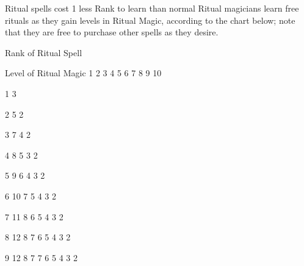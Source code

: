 \documentclass[twoside]{book}
\begin{document}
                  Ritual spells cost 1 less Rank to learn than
                 normal 
                  Ritual magicians learn free rituals as they gain
                 levels in Ritual Magic, according to the chart below;
                 note that they are free to purchase other spells as they
                 desire. 
              
              Rank of Ritual Spell  
                
                  
                   Level of Ritual Magic   
                   1 
                   2   
                   3 
                   4   
                   5 
                   6   
                   7 
                   8   
                   9 
                   10   
                  
                  
                   1 
                   3   
                  
                  
                   2 
                   5 
                   2   
                  
                  
                   3 
                   7 
                   4 
                   2   
                  
                  
                   4 
                   8 
                   5 
                   3 
                   2   
                  
                  
                   5 
                   9 
                   6 
                   4 
                   3 
                   2   
                  
                  
                   6 
                   10 
                   7 
                   5 
                   4 
                   3 
                   2   
                  
                  
                   7 
                   11 
                   8 
                   6 
                   5 
                   4 
                   3 
                   2   
                  
                  
                   8 
                   12 
                   8 
                   7 
                   6 
                   5 
                   4 
                   3 
                   2   
                  
                  
                   9 
                   12 
                   8 
                   7 
                   7 
                   6 
                   5 
                   4 
                   3 
                   2   
                  
\end{document}
